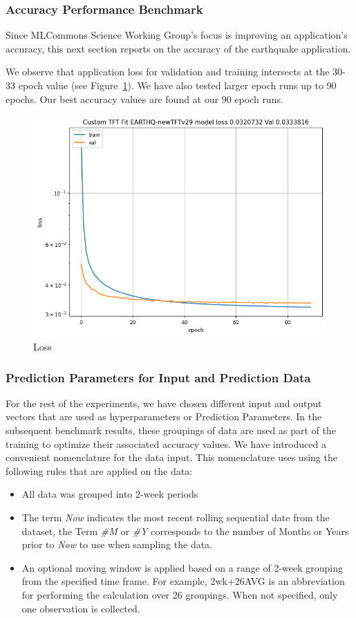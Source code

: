 \documentclass[utf8]{FrontiersinVancouver} %
\begin{document}
\subsubsection{Accuracy Performance Benchmark}
\label{sec:perf-accuracy}

Since MLCommons Science Working Group's focus is improving an
application’s accuracy, this next section reports on the accuracy of
the earthquake application.

We observe that
application loss for validation and training intersects at the 30-33
epoch value (see Figure~\ref{fig:loss}). We have also tested larger
epoch runs up to 90 epochs. Our best accuracy values are found at our
90 epoch runs. 

\begin{figure}[htb]
    \centering
    \includegraphics[width=0.70\columnwidth]{images/loss90.png}
    \caption{Loss}
    \label{fig:loss}
\end{figure}


\subsubsection{Prediction Parameters for Input and Prediction Data}

For the rest of the experiments, we have chosen different input and
output vectors that are used as hyperparameters or Prediction Parameters.
In the subsequent benchmark results, these groupings of data are used as 
part of the training to optimize their 
associated accuracy values. We have introduced a convenient nomenclature for the data input. This nomenclature uses  using the following rules that are applied on the data:

\begin{itemize}
  \item All data was grouped into 2-week periods
  \item The term {\em Now} indicates the most recent rolling sequential date from the dataset,
        the Term {\em \#M} or {\em \#Y} corresponds to the number of Months or Years
        prior to {\em Now} to use when sampling the data. 
  \item An optional moving window is applied based on a range of 2-week grouping
        from the specified time frame.  For example, 2wk+26AVG is an abbreviation
        for performing the calculation over 26 groupings.
        When not specified, only one observation is collected.
\end{itemize}
\end{document}
